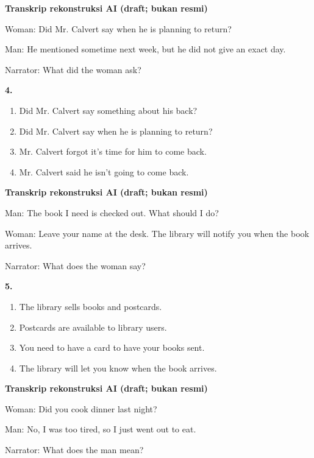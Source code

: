 \documentclass[12pt]{article}
\begin{document}
\par
\vspace{0.25\baselineskip}
\begin{exampleblock}
\textbf{Transkrip rekonstruksi AI (draft; bukan resmi)}\par
Woman: Did Mr. Calvert say when he is planning to return?\par
Man: He mentioned sometime next week, but he did not give an exact day.\par
Narrator: What did the woman ask?\par
\end{exampleblock}
\noindent\textbf{4.}
\begin{enumerate}[label=(\Alph*),leftmargin=*,itemsep=0.2em]
\item Did Mr. Calvert say something about his back?
\item Did Mr. Calvert say when he is planning to return?
\item Mr. Calvert forgot it's time for him to come back.
\item Mr. Calvert said he isn't going to come back.
\end{enumerate}
\par
\vspace{0.25\baselineskip}
\begin{exampleblock}
\textbf{Transkrip rekonstruksi AI (draft; bukan resmi)}\par
Man: The book I need is checked out. What should I do?\par
Woman: Leave your name at the desk. The library will notify you when the book arrives.\par
Narrator: What does the woman say?\par
\end{exampleblock}
\noindent\textbf{5.}
\begin{enumerate}[label=(\Alph*),leftmargin=*,itemsep=0.2em]
\item The library sells books and postcards.
\item Postcards are available to library users.
\item You need to have a card to have your books sent.
\item The library will let you know when the book arrives.
\end{enumerate}
\par
\vspace{0.25\baselineskip}
\begin{exampleblock}
\textbf{Transkrip rekonstruksi AI (draft; bukan resmi)}\par
Woman: Did you cook dinner last night?\par
Man: No, I was too tired, so I just went out to eat.\par
Narrator: What does the man mean?\par
\end{exampleblock}
\end{document}
